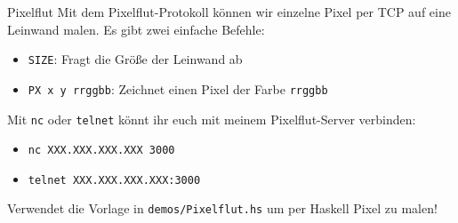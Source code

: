 \documentclass{beamer}
\begin{document}
\begin{frame}{Pixelflut}
  Mit dem Pixelflut-Protokoll können wir einzelne Pixel per TCP auf eine Leinwand malen.
  Es gibt zwei einfache Befehle:

  \begin{itemize}
    \item \texttt{SIZE}: Fragt die Größe der Leinwand ab
    \item \texttt{PX x y rrggbb}: Zeichnet einen Pixel der Farbe \texttt{rrggbb}
  \end{itemize}

  Mit \texttt{nc} oder \texttt{telnet} könnt ihr euch mit meinem Pixelflut-Server verbinden:

  \begin{itemize}
    \item \texttt{nc XXX.XXX.XXX.XXX 3000}
    \item \texttt{telnet XXX.XXX.XXX.XXX:3000}
  \end{itemize}

  Verwendet die Vorlage in \texttt{demos/Pixelflut.hs} um per Haskell Pixel zu malen!
\end{frame}
\end{document}
